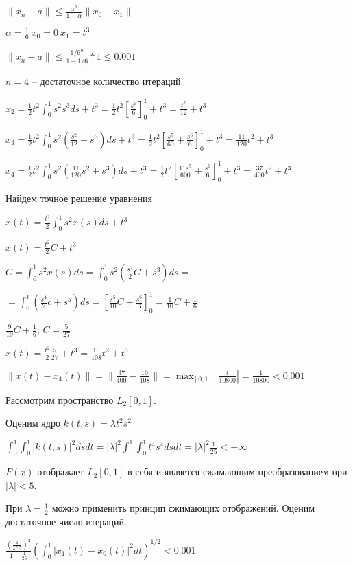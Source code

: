\documentclass[a4paper]{article}
\begin{document}
$ \|x_n - a \| \le \frac{\alpha^n}{1-\alpha} \| x_0 - x_1 \|$

$\alpha = \frac{1}{6}\ x_0 = 0\ x_1 = t^3$

$\| x_n - a\| \le \frac{1/6^n}{1 - 1/6} * 1 \le 0.001$

$n = 4$ -- достаточное количество итераций

$x_2 = \frac{1}{2} t^2 \int_0^1 s^2 s^3 ds + t^3 = 
\frac{1}{2} t^2 [\frac{s^6}{6}]_0^1 + t^3 = 
\frac{t^2}{12} + t^3$

$x_3 = \frac{1}{2} t^2 \int_0^1 s^2 \left( \frac{s^2}{12} + s^3 \right) ds + t^3 = 
\frac{1}{2} t^2 [\frac{s^5}{60} + \frac{s^6}{6}]_0^1 + t^3 = \frac{11}{120} t^2 + t^3$

$x_4 = \frac{1}{2} t^2 \int_0^1 s^2 \left( \frac{11}{120} s^2 + s^3  \right)ds + t^3 =
\frac{1}{2} t^2 [\frac{11 s^5}{600} + \frac{s^6}{6}]_0^1 + t^3 = \frac{37}{400} t^2 + t^3$

Найдем точное решение уравнения 

$x(t) = \frac{t^2}{2} \int_0^1 s^2 x(s) ds + t^3$

$x(t) = \frac{t^2}{2} C + t^3$

$C = \int_0^1 s^2 x(s) ds = \int_0^1 s^2 \left( \frac{s^2}{2} C + s^3 \right) ds = $

$= \int_0^1 \left( \frac{s^4}{2} c + s^5 \right)ds = [\frac{s^5}{10} C + \frac{s^6}{6}]_0^1 =
\frac{1}{10}C + \frac{1}{6}$

$\frac{9}{10} C + \frac{1}{6}$; $C = \frac{5}{27}$

$x(t) = \frac{t^2}{2} \frac{5}{27} + t^3 = \frac{10}{108} t^2 + t^3$

$\| x(t) - x_4(t) \| = \| \frac{37}{400} - \frac{10}{108} \| =  \max_{[0, 1]} |\frac{t}{10800}|  = \frac{1}{10800} < 0.001$


Рассмотрим пространство $L_2[0, 1]$.

Оценим ядро $k(t, s) = \lambda t^2 s^2$

$\int_0^1 \int_0^1 |k(t,s)|^2 ds dt = |\lambda|^2 \int_0^1 \int_0^1 t^4 s^4 ds dt = 
|\lambda|^2 \frac{1}{25} < + \infty$

$F(x)$ отображает $L_2[0, 1]$ в себя и является сжимающим преобразованием при $|\lambda| < 5$.

При $\lambda = \frac{1}{2}$ можно применить принцип сжимающих отображений. Оценим достаточное
число итераций.

$\frac{(\frac{1}{2*5})^2}{1 - \frac{1}{25}} \left( \int_0^1 |x_1(t) - x_0(t)|^2dt \right)^{1/2} < 0.001$
\end{document}
